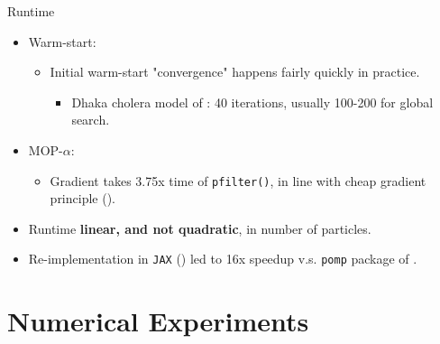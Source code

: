 \documentclass{beamer}
\begin{document}
\begin{frame}{Runtime}

\begin{itemize}
    \item Warm-start:
    \begin{itemize}
        \item \pause Initial warm-start "convergence" happens fairly quickly in practice. 
        \begin{itemize}
            \item \pause Dhaka cholera model of \cite{king08}: 40 iterations, usually 100-200 for global search.
        \end{itemize}
    \end{itemize}
    \item \pause MOP-$\alpha$:
    \begin{itemize}
        \item \pause Gradient takes 3.75x time of \texttt{pfilter()}, in line with cheap gradient principle (\cite{kakade2019provably}).
    \end{itemize}
    \item \pause Runtime \textbf{linear, and not quadratic}, in number of particles.
    \item \pause Re-implementation in \texttt{JAX} (\cite{jax2018github}) led to 16x speedup v.s. \texttt{pomp} package of \cite{king08}.
\end{itemize}

\end{frame}


\section{Numerical Experiments}
\end{document}
